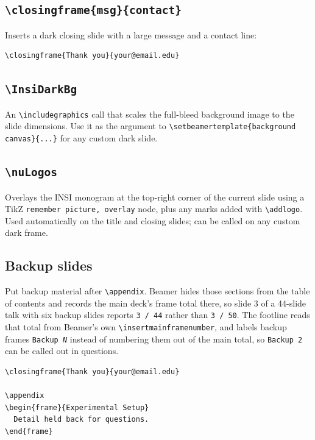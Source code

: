 \documentclass[a4paper,11pt]{article}
\begin{document}
\subsection{\texttt{\textbackslash closingframe\{msg\}\{contact\}}}

Inserts a dark closing slide with a large message and a contact line:

\begin{lstlisting}
\closingframe{Thank you}{your@email.edu}
\end{lstlisting}

\subsection{\texttt{\textbackslash InsiDarkBg}}

An \verb|\includegraphics| call that scales the full-bleed background image
to the slide dimensions.  Use it as the argument to
\verb|\setbeamertemplate{background canvas}{...}| for any custom dark slide.

\subsection{\texttt{\textbackslash nuLogos}}

Overlays the INSI monogram at the top-right corner of the current slide using
a TikZ \texttt{remember picture, overlay} node, plus any marks added with
\verb|\addlogo|.  Used automatically on the title and closing slides; can be
called on any custom dark frame.

\subsection{Backup slides}

Put backup material after \verb|\appendix|.  Beamer hides those sections from
the table of contents and records the main deck's frame total there, so slide 3
of a 44-slide talk with six backup slides reports \texttt{3 / 44} rather than
\texttt{3 / 50}.  The footline reads that total from Beamer's own
\verb|\insertmainframenumber|, and labels backup frames
\texttt{Backup~\textit{N}} instead of numbering them out of the main total, so
\texttt{Backup 2} can be called out in questions.

\begin{lstlisting}
\closingframe{Thank you}{your@email.edu}

\appendix
\begin{frame}{Experimental Setup}
  Detail held back for questions.
\end{frame}
\end{lstlisting}
\end{document}
